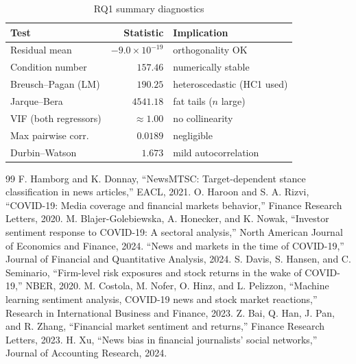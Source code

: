 \documentclass[conference]{IEEEtran}
\begin{document}
\begin{table}[!t]
\caption{RQ1 summary diagnostics}
\label{tab:app_mlr}
\centering
\small
\begin{tabular}{lrl}
\toprule
Test & Statistic & Implication \\
\midrule
Residual mean         & $-9.0\times10^{-19}$ & orthogonality OK \\
Condition number      & $157.46$ & numerically stable \\
Breusch--Pagan (LM)   & $190.25$ & heteroscedastic (HC1 used) \\
Jarque--Bera          & $4541.18$ & fat tails ($n$ large) \\
VIF (both regressors) & $\approx 1.00$ & no collinearity \\
Max pairwise corr.    & $0.0189$ & negligible \\
Durbin--Watson        & $1.673$ & mild autocorrelation \\
\bottomrule
\end{tabular}
\end{table}


\begin{thebibliography}{99}
 F. Hamborg and K. Donnay, ``NewsMTSC: Target-dependent stance classification in news articles,'' EACL, 2021.
 O. Haroon and S. A. Rizvi, ``COVID-19: Media coverage and financial markets behavior,'' Finance Research Letters, 2020.
 M. Blajer-Golebiewska, A. Honecker, and K. Nowak, ``Investor sentiment response to COVID-19: A sectoral analysis,'' North American Journal of Economics and Finance, 2024.
 ``News and markets in the time of COVID-19,'' Journal of Financial and Quantitative Analysis, 2024.
 S. Davis, S. Hansen, and C. Seminario, ``Firm-level risk exposures and stock returns in the wake of COVID-19,'' NBER, 2020.
 M. Costola, M. Nofer, O. Hinz, and L. Pelizzon, ``Machine learning sentiment analysis, COVID-19 news and stock market reactions,'' Research in International Business and Finance, 2023.
 Z. Bai, Q. Han, J. Pan, and R. Zhang, ``Financial market sentiment and returns,'' Finance Research Letters, 2023.
 H. Xu, ``News bias in financial journalists' social networks,'' Journal of Accounting Research, 2024.
\end{thebibliography}
\end{document}

